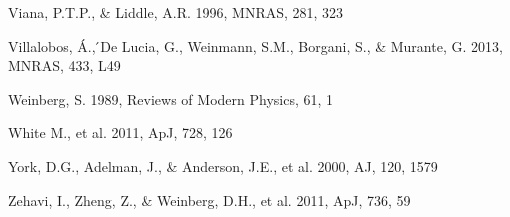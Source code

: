 \documentclass[iop]{emulateapj}
\begin{document}
\begin{thebibliography}{}
Viana, P.T.P., \& Liddle, A.R. 1996, MNRAS, 281, 323

Villalobos, \'{A}., ́De Lucia, G., Weinmann, S.M., Borgani, S., \& Murante, G. 2013, MNRAS, 433, L49


Weinberg, S. 1989, Reviews of Modern Physics, 61, 1

White M., et al. 2011, ApJ, 728, 126

York, D.G., Adelman, J., \& Anderson, J.E., et al. 2000, AJ, 120, 1579

Zehavi, I., Zheng, Z., \& Weinberg, D.H., et al. 2011, ApJ, 736, 59




\end{thebibliography}
\end{document}
